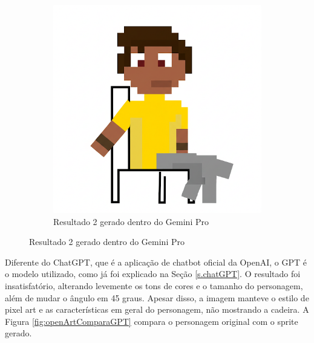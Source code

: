 \begin{figure}[htbp]
\begin{subfigure}{0.32\linewidth}
        \includegraphics[width=1\linewidth]{figs/geminiPro/compararDalle3_res2.PNG}
        \caption{\small Resultado 2 gerado dentro do Gemini Pro}
        \label{fig:openArtComparaGemini3}
    \end{subfigure}
\end{figure}

Diferente do ChatGPT, que é a aplicação de chatbot oficial da OpenAI, o GPT é o modelo utilizado, como já foi explicado na Seção \ref{s.chatGPT}. O resultado foi insatisfatório, alterando levemente os tons de cores e o tamanho do personagem, além de mudar o ângulo em 45 graus. Apesar disso, a imagem manteve o estilo de pixel art e as características em geral do personagem, não mostrando a cadeira. A Figura \ref{fig:openArtComparaGPT} compara o personagem original com o sprite gerado.

